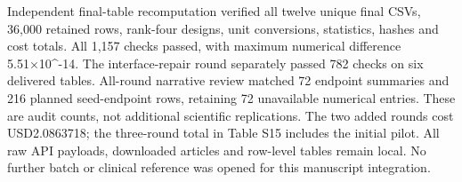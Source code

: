 \documentclass[11pt,letterpaper]{article}
\begin{document}
Independent final-table recomputation verified all twelve unique final CSVs, 36,000 retained rows, rank-four designs, unit conversions, statistics, hashes and cost totals. All 1,157 checks passed, with maximum numerical difference 5.51×10\textasciicircum{}-14. The interface-repair round separately passed 782 checks on six delivered tables. All-round narrative review matched 72 endpoint summaries and 216 planned seed-endpoint rows, retaining 72 unavailable numerical entries. These are audit counts, not additional scientific replications. The two added rounds cost USD2.0863718; the three-round total in Table S15 includes the initial pilot. All raw API payloads, downloaded articles and row-level tables remain local. No further batch or clinical reference was opened for this manuscript integration.


\FloatBarrier

\begingroup

\small

\renewcommand{\arraystretch}{1.22}
\end{document}
